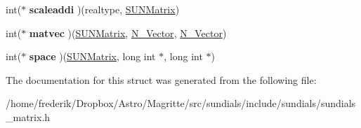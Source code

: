 \begin{DoxyCompactItemize}
\item 
\mbox{\label{struct__generic__SUNMatrix__Ops_a674442e1acaa5632c193de7338462735}} 
int($\ast$ {\bfseries scaleaddi} )(realtype, \mbox{\hyperlink{struct__generic__SUNMatrix}{S\+U\+N\+Matrix}})
\item 
\mbox{\label{struct__generic__SUNMatrix__Ops_a17dbb7d83de940327ee7d2ed1957d5e9}} 
int($\ast$ {\bfseries matvec} )(\mbox{\hyperlink{struct__generic__SUNMatrix}{S\+U\+N\+Matrix}}, \mbox{\hyperlink{struct__generic__N__Vector}{N\+\_\+\+Vector}}, \mbox{\hyperlink{struct__generic__N__Vector}{N\+\_\+\+Vector}})
\item 
\mbox{\label{struct__generic__SUNMatrix__Ops_ab0c19c93c3f4f4f006f2c7f4db89e79f}} 
int($\ast$ {\bfseries space} )(\mbox{\hyperlink{struct__generic__SUNMatrix}{S\+U\+N\+Matrix}}, long int $\ast$, long int $\ast$)
\end{DoxyCompactItemize}


The documentation for this struct was generated from the following file\+:\begin{DoxyCompactItemize}
\item 
/home/frederik/\+Dropbox/\+Astro/\+Magritte/src/sundials/include/sundials/sundials\+\_\+matrix.\+h\end{DoxyCompactItemize}
